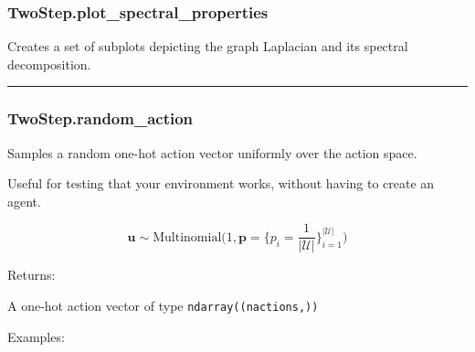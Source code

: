 \subsubsection{TwoStep.plot\_spectral\_properties}\label{twostep.plot_spectral_properties}

\begin{Shaded}
\begin{Highlighting}[]
\OperatorTok{=}\OperatorTok{=}\OperatorTok{=}\NormalTok{)}
\end{Highlighting}
\end{Shaded}

Creates a set of subplots depicting the graph Laplacian and its spectral
decomposition.

\begin{center}\rule{0.5\linewidth}{\linethickness}\end{center}

\subsubsection{TwoStep.random\_action}\label{twostep.random_action}

\begin{Shaded}
\begin{Highlighting}[]
\NormalTok{)}
\end{Highlighting}
\end{Shaded}

Samples a random one-hot action vector uniformly over the action space.

Useful for testing that your environment works, without having to create
an agent.

\[
\mathbf u \sim \mathrm{Multinomial}\Big(1, \mathbf p=\{p_i = \frac{1}{|\mathcal U|}\}_{i=1}^{|\mathcal U|}\Big)
\]

Returns:

A one-hot action vector of type \texttt{ndarray((nactions,))}

Examples:

\begin{Shaded}
\begin{Highlighting}[]
\OperatorTok{=}
\end{Highlighting}
\end{Shaded}

